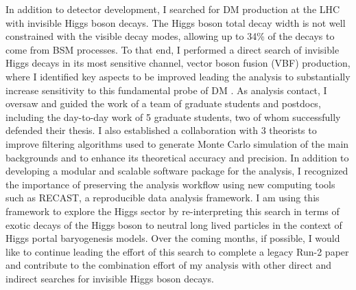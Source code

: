 \documentclass[a4paper]{article}
\begin{document}
In addition to detector development, I searched for DM production at the LHC with invisible Higgs boson decays. The Higgs boson total decay width is not well constrained with the visible decay modes, allowing up to 34\% of the decays to come from BSM processes. To that end, I performed a direct search of invisible Higgs decays in its most sensitive channel, vector boson fusion (VBF) production, where I identified key aspects to be improved leading the analysis to substantially increase sensitivity to this fundamental probe of DM \cite{vbfMET_CONF2020}. As analysis contact, I oversaw and guided the work of a team of graduate students and postdocs, including the day-to-day work of 5 graduate students, two of whom successfully defended their thesis. I also established a collaboration with 3 theorists to improve filtering algorithms used to generate Monte Carlo simulation of the main backgrounds and to enhance its theoretical accuracy and precision. In addition to developing a modular and scalable software package for the analysis, I recognized the importance of preserving the analysis workflow using new computing tools such as RECAST, a reproducible data analysis framework. I am using this framework to explore the Higgs sector by re-interpreting this search in terms of exotic decays of the Higgs boson to neutral long lived particles in the context of Higgs portal baryogenesis models. Over the coming months, if possible, I would like to continue leading the effort of this search to complete a legacy Run-2 paper and contribute to the combination effort of my analysis with other direct and indirect searches for invisible Higgs boson decays.

\bigskip
\end{document}
